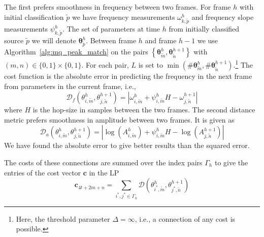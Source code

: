 The first prefers
smoothness in frequency between two frames. For frame $h$ with initial
classification $\tilde{p}$ we have frequency measurements
$\omega_{k,\tilde{p}}^{h}$
and frequency slope measurements $\psi_{k,\tilde{p}}^{h}$. The set of parameters
at time $h$ from initially classified source $\tilde{p}$ we will denote
$\boldsymbol{\theta}_{\tilde{p}}^{h}$. Between frame $h$ and frame $h-1$ we use
Algorithm~\ref{alg:mq_peak_match} on the pairs $\left\{ \boldsymbol{\theta}_{\tilde{m}}^{h},
\boldsymbol{\theta}_{\tilde{n}}^{h+1} \right\}$ with $(m,n) \in \{0,1\} \times
\{0,1\}$. For
each pair, $L$ is set to $\min(\# \boldsymbol{\theta}_{\tilde{m}}^{h} ,
\# \boldsymbol{\theta}_{\tilde{n}}^{h+1}).$\footnote{Here, the threshold parameter $\Delta
= \infty$, i.e., a connection of any cost is possible.} The cost function is the absolute error
in predicting the frequency in the next frame from parameters in the current
frame, i.e.,
\[
    \mathcal{D}_{f} \left( \theta_{i,\tilde{m}}^{h},
    \theta_{j,\tilde{n}}^{h+1} \right) = | \omega_{i,\tilde{m}}^{h} +
    \psi_{i,\tilde{m}}^{h} H - \omega_{j,\tilde{n}}^{h+1} |
\]
where $H$ is the
hop-size in samples between the two frames.
The second distance metric prefers smoothness in amplitude between two frames.
It is given as
\[
    \mathcal{D}_{a} \left( \theta_{i,\tilde{m}}^{h},
    \theta_{j,\tilde{n}}^{h+1} \right) = | \log(A_{i,\tilde{m}}^{h}) +
    \psi_{i,\tilde{m}}^{h} H - \log(A_{j,\tilde{n}}^{h+1}) |
\]
We have found the absolute error to
give better results than the squared error.

The costs of these connections
are summed over the index pairs $\Gamma_{h}$ to give the entries of the cost
vector $\boldsymbol{c}$ in the LP
\[
    \boldsymbol{c}_{4t + 2m + n} = \sum_{i^{\ast},j^{\ast} \in \Gamma_{h}}
    \mathcal{D} \left( \theta_{i^{\ast},\tilde{m}}^{h}, \theta_{j^{\ast},\tilde{n}}^{h+1}
    \right)
\]

